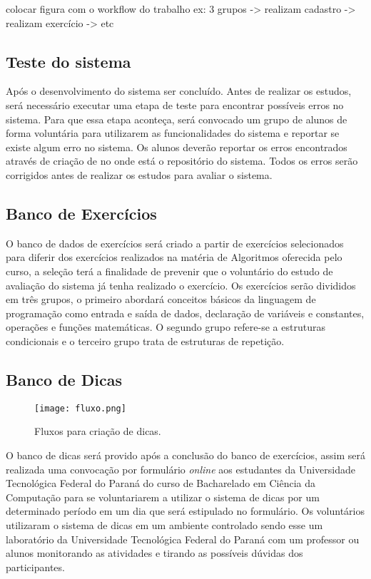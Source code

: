 colocar figura com o workflow do trabalho
ex: 3 grupos -> realizam cadastro -> realizam exercício -> etc

\subsection{Teste do sistema}

Após o desenvolvimento do sistema ser concluído. Antes de realizar os estudos, será necessário executar uma etapa de teste para encontrar possíveis erros no sistema. Para que essa etapa aconteça, será convocado um grupo de alunos de forma voluntária para utilizarem as funcionalidades do sistema e reportar se existe algum erro no sistema. Os alunos deverão reportar os erros encontrados através de criação de  no  onde está o repositório do sistema. Todos os erros serão corrigidos antes de realizar os estudos para avaliar o sistema.

\subsection{Banco de Exercícios}

O banco de dados de exercícios será criado a partir de exercícios selecionados para diferir dos exercícios realizados na matéria de Algoritmos oferecida pelo curso, a seleção terá a finalidade de prevenir que o voluntário do estudo de avaliação do sistema já tenha realizado o exercício. Os exercícios serão divididos em três grupos, o primeiro abordará conceitos básicos da linguagem de programação como entrada e saída de dados, declaração de variáveis e constantes, operações e funções matemáticas. O segundo grupo refere-se a estruturas condicionais e o terceiro grupo trata de estruturas de repetição.

\subsection{Banco de Dicas}

\begin{figure}[ht]
	\captionsetup{justification=centering}
	\texttt{[image: fluxo.png]}
	\caption{Fluxos para criação de dicas.}
	\label{figura:dicafluxo}
\end{figure}


O banco de dicas será provido após a conclusão do banco de exercícios, assim será realizada uma convocação por formulário \textit{online} aos estudantes da Universidade Tecnológica Federal do Paraná do curso de Bacharelado em Ciência da Computação para se voluntariarem a utilizar o sistema de dicas por um determinado período em um dia que será estipulado no formulário. Os voluntários utilizaram o sistema de dicas em um ambiente controlado sendo esse um laboratório da Universidade Tecnológica Federal do Paraná com um professor ou alunos monitorando as atividades e tirando as possíveis dúvidas dos participantes. 

